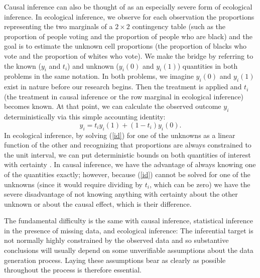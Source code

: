 \documentclass[11pt,titlepage]{article}
\begin{document}
Causal inference can also be thought of as an especially severe form
of ecological inference.  In ecological inference, we observe for each
observation the proportions representing the two marginals of a
$2\times 2$ contingency table (such as the proportion of people voting
and the proportion of people who are black) and the goal is to
estimate the unknown cell proportions (the proportion of blacks who
vote and the proportion of whites who vote).  We make the bridge by
referring to the known ($y_i$ and $t_i$) and unknown ($y_i(0)$ and
$y_i(1)$) quantities in both problems in the same notation.  In both
problems, we imagine $y_i(0)$ and $y_i(1)$ exist in nature before our
research begins.  Then the treatment is applied and $t_i$ (the
treatment in causal inference or the row marginal in ecological
inference) becomes known.  At that point, we can calculate the
observed outcome $y_i$ deterministically via this simple accounting
identity:
\begin{equation}
  \label{id}
  y_i = t_iy_i(1) + (1-t_i)y_i(0).
\end{equation}
In ecological inference, by solving (\ref{id}) for one of the unknowns
as a linear function of the other and recognizing that proportions are
always constrained to the unit interval, we can put deterministic
bounds on both quantities of interest with certainty
\citep[][ch.5]{King97}.  In causal inference, we have the advantage of
always knowing one of the quantities exactly; however, because
(\ref{id}) cannot be solved for one of the unknowns (since it would
require dividing by $t_i$, which can be zero) we have the severe
disadvantage of not knowing anything with certainty about the other
unknown or about the causal effect, which is their difference.  

The fundamental difficulty is the same with causal inference,
statistical inference in the presence of missing data, and ecological
inference: The inferential target is not normally highly constrained
by the observed data and so substantive conclusions will usually
depend on some unverifiable assumptions about the data generation
process.  Laying these assumptions bear as clearly as possible
throughout the process is therefore essential.
\end{document}
